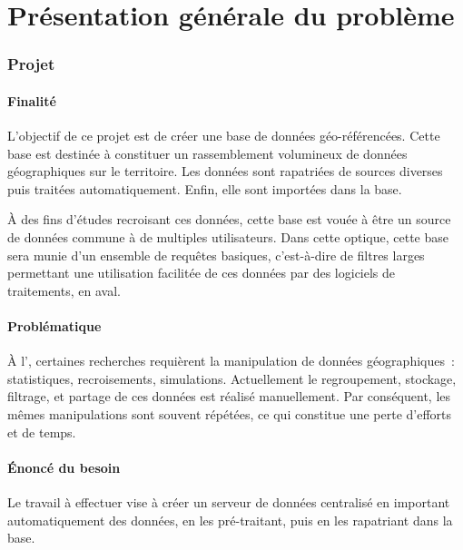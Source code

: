 \documentclass[french,12pt]{article}
\begin{document}

\part{Présentation générale du problème}

\section{Projet}

\subsection{Finalité}

L'objectif de ce projet est de créer une base de données géo-référencées. Cette base est destinée à constituer un rassemblement volumineux de données géographiques sur le territoire. Les données sont rapatriées de sources diverses puis traitées automatiquement. Enfin, elle sont importées dans la base.

À des fins d'études recroisant ces données, cette base est vouée à être un source de données commune à de multiples utilisateurs. Dans cette optique, cette base sera munie d'un ensemble de requêtes basiques, c'est-à-dire de filtres larges permettant une utilisation facilitée de ces données par des logiciels de traitements, en aval.

\subsection{Problématique}

À l', certaines recherches requièrent la manipulation de données géographiques~: statistiques, recroisements, simulations. Actuellement le regroupement, stockage, filtrage, et partage de ces données est réalisé manuellement. Par conséquent, les mêmes manipulations sont souvent répétées, ce qui constitue une perte d'efforts et de temps.

\subsection{Énoncé du besoin}

Le travail à effectuer vise à créer un serveur de données centralisé en important automatiquement des données, en les pré-traitant, puis en les rapatriant dans la base.
\end{document}
